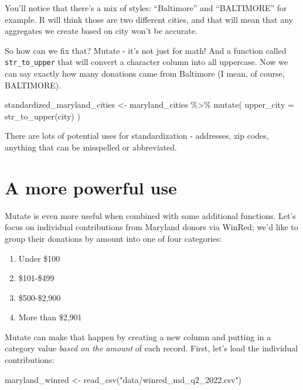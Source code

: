 \documentclass[
  letterpaper,
  DIV=11,
  numbers=noendperiod]{scrreprt}
\newenvironment{Shaded}{\begin{snugshade}}{\end{snugshade}}
\newcommand{\AttributeTok}[1]{\textcolor[rgb]{0.40,0.45,0.13}{#1}}
\newcommand{\FunctionTok}[1]{\textcolor[rgb]{0.28,0.35,0.67}{#1}}
\newcommand{\NormalTok}[1]{\textcolor[rgb]{0.00,0.23,0.31}{#1}}
\newcommand{\OtherTok}[1]{\textcolor[rgb]{0.00,0.23,0.31}{#1}}
\newcommand{\SpecialCharTok}[1]{\textcolor[rgb]{0.37,0.37,0.37}{#1}}
\newcommand{\StringTok}[1]{\textcolor[rgb]{0.13,0.47,0.30}{#1}}
\providecommand{\tightlist}{%
  \setlength{\itemsep}{0pt}\setlength{\parskip}{0pt}}\usepackage{longtable,booktabs,array}
\begin{document}
You'll notice that there's a mix of styles: ``Baltimore'' and
``BALTIMORE'' for example. R will think those are two different cities,
and that will mean that any aggregates we create based on city won't be
accurate.

So how can we fix that? Mutate - it's not just for math! And a function
called \texttt{str\_to\_upper} that will convert a character column into
all uppercase. Now we can say exactly how many donations came from
Baltimore (I mean, of course, BALTIMORE).

\begin{Shaded}
\begin{Highlighting}[]
\NormalTok{standardized\_maryland\_cities }\OtherTok{\textless{}{-}}\NormalTok{ maryland\_cities }\SpecialCharTok{\%\textgreater{}\%}
  \FunctionTok{mutate}\NormalTok{(}
    \AttributeTok{upper\_city =} \FunctionTok{str\_to\_upper}\NormalTok{(city)}
\NormalTok{)}
\end{Highlighting}
\end{Shaded}

There are lots of potential uses for standardization - addresses, zip
codes, anything that can be misspelled or abbreviated.

\hypertarget{a-more-powerful-use}{%
\section{A more powerful use}\label{a-more-powerful-use}}

Mutate is even more useful when combined with some additional functions.
Let's focus on individual contributions from Maryland donors via WinRed;
we'd like to group their donations by amount into one of four
categories:

\begin{enumerate}
\def\labelenumi{\arabic{enumi}.}
\tightlist
\item
  Under \$100
\item
  \$101-\$499
\item
  \$500-\$2,900
\item
  More than \$2,901
\end{enumerate}

Mutate can make that happen by creating a new column and putting in a
category value \emph{based on the amount} of each record. First, let's
load the individual contributions:

\begin{Shaded}
\begin{Highlighting}[]
\NormalTok{maryland\_winred }\OtherTok{\textless{}{-}} \FunctionTok{read\_csv}\NormalTok{(}\StringTok{"data/winred\_md\_q2\_2022.csv"}\NormalTok{)}
\end{Highlighting}
\end{Shaded}
\end{document}
